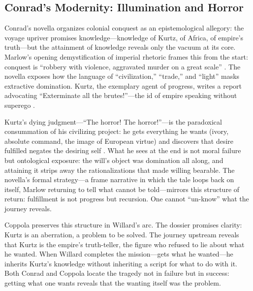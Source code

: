 \subsection*{Conrad's Modernity: Illumination and Horror}
\label{ssec:conrad-s-modernity-illumination-and-horror}
Conrad's novella organizes colonial conquest as an epistemological allegory: the voyage upriver 
promises knowledge—knowledge of Kurtz, of Africa, of empire's truth—but the attainment of 
knowledge reveals only the vacuum at its core. Marlow's opening demystification of imperial 
rhetoric frames this from the start: conquest is ``robbery with violence, aggravated murder on 
a great scale'' \parencite{ConradHOD1990}. The novella exposes how the language of 
``civilization,'' ``trade,'' and ``light'' masks extractive domination. Kurtz, the exemplary 
agent of progress, writes a report advocating ``Exterminate all the brutes!''—the id of empire 
speaking without superego \parencite{ConradHOD1990}.

Kurtz's dying judgment---``The horror! The horror!''---is the paradoxical consummation of his 
civilizing project: he gets everything he wants (ivory, absolute command, the image of European 
virtue) and discovers that desire fulfilled negates the desiring self \parencite{ConradHOD1990}. 
What he sees at the end is not moral failure but ontological exposure: the will's object was 
domination all along, and attaining it strips away the rationalizations that made willing 
bearable. The novella's formal strategy---a frame narrative in which the tale loops back on 
itself, Marlow returning to tell what cannot be told—mirrors this structure of return: 
fulfillment is not progress but recursion. One cannot ``un-know'' what the journey reveals.

Coppola preserves this structure in Willard's arc. The dossier promises clarity: Kurtz is an 
aberration, a problem to be solved. The journey upstream reveals that Kurtz is the empire's 
truth-teller, the figure who refused to lie about what he wanted. When Willard completes the 
mission—gets what he wanted—he inherits Kurtz's knowledge without inheriting a script for what 
to do with it. Both Conrad and Coppola locate the tragedy not in failure but in success: 
getting what one wants reveals that the wanting itself was the problem.
